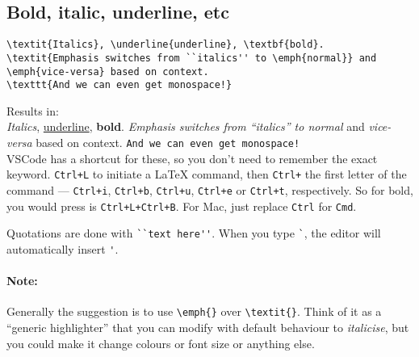 \subsection{Bold, italic, underline, etc}

\begin{lstlisting}
\textit{Italics}, \underline{underline}, \textbf{bold}.
\textit{Emphasis switches from ``italics'' to \emph{normal}} and \emph{vice-versa} based on context.
\texttt{And we can even get monospace!}
\end{lstlisting}
Results in: \\
\textit{Italics}, \underline{underline}, \textbf{bold}.
\textit{Emphasis switches from ``italics'' to \emph{normal}} and \emph{vice-versa} based on context.
\texttt{And we can even get monospace!}\\

VSCode has a shortcut for these, so you don't need to remember the exact keyword. \verb|Ctrl+L| to initiate a LaTeX command, then \verb|Ctrl+| the first letter of the command --- \verb|Ctrl+i|, \verb|Ctrl+b|, \verb|Ctrl+u|, \verb|Ctrl+e| or \verb|Ctrl+t|, respectively.
So for bold, you would press is \verb|Ctrl+L+Ctrl+B|.
For Mac, just replace \verb|Ctrl| for \verb|Cmd|.

Quotations are done with \verb|``text here''|.
When you type \verb|`|, the editor will automatically insert \verb|'|.

\paragraph{Note:} Generally the suggestion is to use \verb|\emph{}| over \verb|\textit{}|. Think of it as a ``generic highlighter'' that you can modify with default behaviour to \emph{italicise}, but you could make it change colours or font size or anything else.